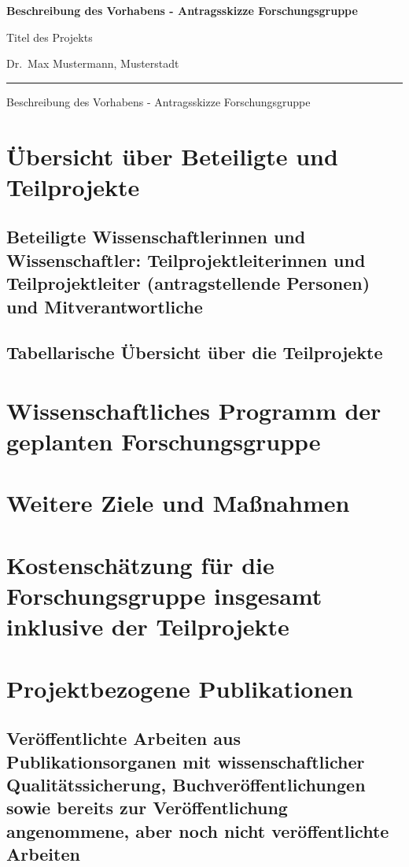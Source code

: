 \documentclass{scrartcl}
\newcommand{\spokesperson}{Dr.\ Max Mustermann, Musterstadt}
\newcommand{\project}{Titel des Projekts}
\begin{document}
{\raggedright{} \normalsize \bfseries 
	Beschreibung des Vorhabens - Antragsskizze Forschungsgruppe \par
    \project{} \par
    \spokesperson{} \par
	\rule{\textwidth}{0.5pt} \par
	Beschreibung des Vorhabens - Antragsskizze Forschungsgruppe
}

\section{Übersicht über Beteiligte und Teilprojekte}

\subsection{Beteiligte Wissenschaftlerinnen und Wissenschaftler: Teilprojektleiterinnen und Teilprojektleiter (antragstellende Personen) und Mitverantwortliche}

\subsection{Tabellarische Übersicht über die Teilprojekte}


\section{Wissenschaftliches Programm der geplanten Forschungsgruppe}


\section{Weitere Ziele und Maßnahmen}


\section{Kostenschätzung für die Forschungsgruppe insgesamt inklusive der Teilprojekte}

\section{Projektbezogene Publikationen}

\subsection{Veröffentlichte Arbeiten aus Publikationsorganen mit wissenschaftlicher Qualitätssicherung, Buchveröffentlichungen sowie bereits zur Veröffentlichung angenommene, aber noch nicht veröffentlichte Arbeiten}
\printbibliography[category=reviewed, heading=none]
\end{document}
